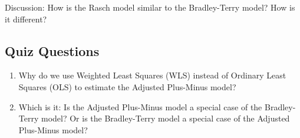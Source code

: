 \documentclass{article}
\begin{document}
  \begin{framed}
    {\sc Discussion:} How is the Rasch model similar to the Bradley-Terry model? How is it different?
  \end{framed}

  \subsection{\sc Quiz Questions}

  \begin{enumerate}
    \item Why do we use Weighted Least Squares (WLS) instead of Ordinary Least Squares (OLS) to estimate the Adjusted Plus-Minus model?
    \item Which is it: Is the Adjusted Plus-Minus model a special case of the Bradley-Terry model? Or is the Bradley-Terry model a special case of the Adjusted Plus-Minus model?
  \end{enumerate}
\end{document}
